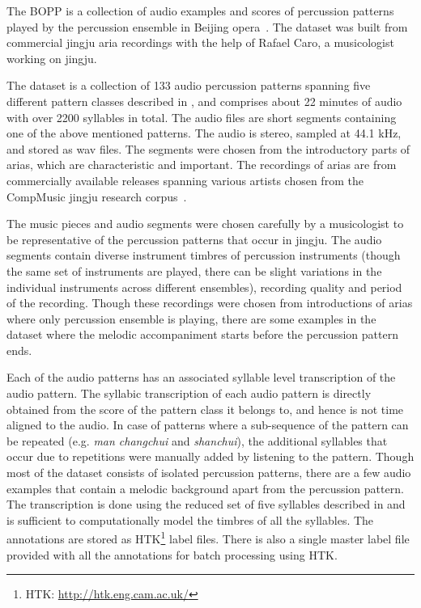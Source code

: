 The \acrfull{BOPP} is a collection of audio examples and scores of percussion patterns played by the percussion ensemble in Beijing opera~\cite{ajay:14:ismirbo}. The dataset was built from commercial \gls{jingju} aria recordings with the help of Rafael Caro, a musicologist working on \gls{jingju}. 

The dataset is a collection of 133 audio percussion patterns spanning five different pattern classes described in , and comprises about 22 minutes of audio with over 2200 syllables in total. The audio files are short segments containing one of the above mentioned patterns. The audio is stereo, sampled at 44.1 kHz, and stored as wav files. The segments were chosen from the introductory parts of arias, which are characteristic and important. The recordings of arias are from commercially available releases spanning various artists chosen from the CompMusic \gls{jingju} research corpus~\cite{caro:14:jingjudata}.

The music pieces and audio segments were chosen carefully by a musicologist to be representative of the percussion patterns that occur in \gls{jingju}. The audio segments contain diverse instrument timbres of percussion instruments (though the same set of instruments are played, there can be slight variations in the individual instruments across different ensembles), recording quality and period of the recording. Though these recordings were chosen from introductions of arias where only percussion ensemble is playing, there are some examples in the dataset where the melodic accompaniment starts before the percussion pattern ends. 

Each of the audio patterns has an associated syllable level transcription of the audio pattern. The syllabic transcription of each audio pattern is directly obtained from the score of the pattern class it belongs to, and hence is not time aligned to the audio. In case of patterns where a sub-sequence of the pattern can be repeated (e.g. \textit{man changchui} and \textit{shanchui}), the additional syllables that occur due to repetitions were manually added by listening to the pattern. Though most of the dataset consists of isolated percussion patterns, there are a few audio examples that contain a melodic background apart from the percussion pattern. The transcription is done using the reduced set of five syllables described in  and is sufficient to computationally model the timbres of all the syllables. The annotations are stored as \gls{HTK}\footnote{\gls{HTK}: \url{http://htk.eng.cam.ac.uk/}} label files. There is also a single master label file provided with all the annotations for batch processing using \gls{HTK}. 

